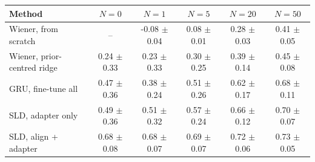 \begin{tabular}{lccccc}
\toprule
Method & $N=0$ & $N=1$ & $N=5$ & $N=20$ & $N=50$ \\
\midrule
Wiener, from scratch & -- & -0.08 $\pm$ 0.04 & 0.08 $\pm$ 0.01 & 0.28 $\pm$ 0.03 & 0.41 $\pm$ 0.05 \\
Wiener, prior-centred ridge & 0.24 $\pm$ 0.33 & 0.23 $\pm$ 0.33 & 0.30 $\pm$ 0.25 & 0.39 $\pm$ 0.14 & 0.45 $\pm$ 0.08 \\
GRU, fine-tune all & 0.47 $\pm$ 0.36 & 0.38 $\pm$ 0.24 & 0.51 $\pm$ 0.26 & 0.62 $\pm$ 0.17 & 0.68 $\pm$ 0.11 \\
SLD, adapter only & 0.49 $\pm$ 0.36 & 0.51 $\pm$ 0.32 & 0.57 $\pm$ 0.24 & 0.66 $\pm$ 0.12 & 0.70 $\pm$ 0.07 \\
SLD, align + adapter & 0.68 $\pm$ 0.08 & 0.68 $\pm$ 0.07 & 0.69 $\pm$ 0.07 & 0.72 $\pm$ 0.06 & 0.73 $\pm$ 0.05 \\
\bottomrule
\end{tabular}
